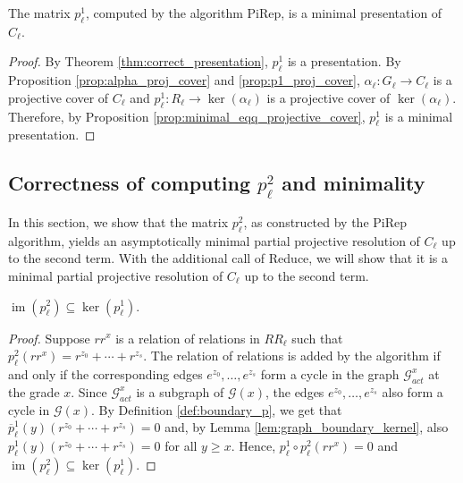 \documentclass[english,a4paper,nolineno,cleveref]{socg-lipics-v2021}
\DeclareMathOperator{\im}{im}
\begin{document}
\begin{theorem} \label{thm:correct_minimal_presentation}
The matrix $p_\ell^1$, computed by the algorithm {\sc PiRep}, is a minimal presentation of $C_\ell$.
\label{thm:p1min}
\end{theorem}

\begin{proof}
By Theorem \ref{thm:correct_presentation}, $p_\ell^1$ is a presentation. By Proposition \ref{prop:alpha_proj_cover} and \ref{prop:p1_proj_cover}, $\alpha_\ell\colon G_\ell\rightarrow C_\ell$ is a projective cover of $C_\ell$ and $p_\ell^1\colon R_\ell\rightarrow \ker(\alpha_\ell)$ is a projective cover of $\ker(\alpha_\ell)$. Therefore, by Proposition \ref{prop:minimal_eqq_projective_cover}, $p_\ell^1$ is a minimal presentation.
\end{proof}

\subsection{Correctness of computing $p_\ell^2$ and minimality}
\label{sec:p2correctness}

In this section, we show that the matrix $p_\ell^2$, as constructed by the {\sc PiRep} algorithm, yields an asymptotically minimal partial projective resolution of $C_\ell$ up to the second term. With the additional call of {\sc Reduce}, we will show that it is a minimal partial projective resolution of $C_\ell$ up to the second term.

\begin{proposition} \label{prop:exact_at2_1}
    $\im(p_\ell^2) \subseteq \ker(p_\ell^1)$.
\end{proposition}

\begin{proof}
Suppose $rr^{x}$ is a relation of relations in $RR_\ell$ such that $p^2_\ell(rr^{x})= r^{z_0}+\cdots+r^{z_s}$. The relation of relations is added by the algorithm if and only if the corresponding edges $e^{z_0},\ldots,e^{z_s}$ form a cycle in the graph $\mathcal{G}_{act}^{x}$ at the grade $x$. Since $\mathcal{G}_{act}^{x}$ is a subgraph of $\mathcal{G}(x)$, the edges $e^{z_0},\ldots,e^{z_s}$ also form a cycle in $\mathcal{G}(x)$. By Definition \ref{def:boundary_p}, we get that $\overline{p}_\ell^1(y)(r^{z_0}+\cdots+r^{z_s})=0$ and, by Lemma \ref{lem:graph_boundary_kernel}, also $p_\ell^1(y)(r^{z_0}+\cdots+r^{z_s})=0$ for all $y\geq x$. Hence, $p^1_\ell\circ p_\ell^2(rr^{x})=0$ and $\im(p_\ell^2)\subseteq \ker(p_\ell^1)$.
\end{proof}
\end{document}
